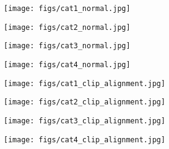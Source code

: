 \documentclass[10pt,twocolumn,letterpaper]{article}
\begin{document}
\begin{figure}[!t]
\centering
    \begin{subfigure}{0.25\linewidth}
        \centering
        \texttt{[image: figs/cat1\_normal.jpg]}
        \vspace{-4mm}
    \end{subfigure}
    \begin{subfigure}{0.25\linewidth}
        \centering
        \texttt{[image: figs/cat2\_normal.jpg]}
        \vspace{-4mm}
    \end{subfigure}
    \begin{subfigure}{0.28\linewidth}
        \centering
        \texttt{[image: figs/cat3\_normal.jpg]}
        \vspace{-4mm}
    \end{subfigure}
    \begin{subfigure}{0.14\linewidth}
        \centering
        \texttt{[image: figs/cat4\_normal.jpg]}
        \vspace{-4mm}
    \end{subfigure}

    \begin{subfigure}{0.25\linewidth}
        \centering
        \texttt{[image: figs/cat1\_clip\_alignment.jpg]}
        \vspace{-4mm}
    \end{subfigure}
    \begin{subfigure}{0.25\linewidth}
        \centering
        \texttt{[image: figs/cat2\_clip\_alignment.jpg]}
        \vspace{-4mm}
    \end{subfigure}
    \begin{subfigure}{0.28\linewidth}
        \centering
        \texttt{[image: figs/cat3\_clip\_alignment.jpg]}
        \vspace{-4mm}
    \end{subfigure}
    \begin{subfigure}{0.14\linewidth}
        \centering
        \texttt{[image: figs/cat4\_clip\_alignment.jpg]}
        \vspace{-4mm}
    \end{subfigure}


\end{figure}
\end{document}
